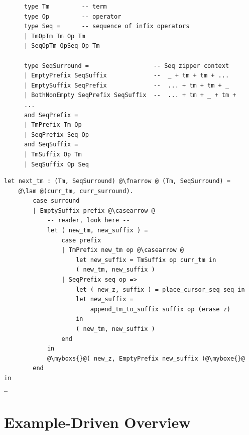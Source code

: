 \documentclass[runningheads]{llncs}
\begin{document}
\begin{figure}
\begin{lstlisting}
type Tm         -- term
type Op         -- operator
type Seq =      -- sequence of infix operators
| TmOpTm Tm Op Tm
| SeqOpTm OpSeq Op Tm
	
type SeqSurround =                  -- Seq zipper context
| EmptyPrefix SeqSuffix             --  _ + tm + tm + ...
| EmptySuffix SeqPrefix             --  ... + tm + tm + _
| BothNonEmpty SeqPrefix SeqSuffix  --  ... + tm + _ + tm + ...
and SeqPrefix =
| TmPrefix Tm Op
| SeqPrefix Seq Op
and SeqSuffix =
| TmSuffix Op Tm
| SeqSuffix Op Seq
\end{lstlisting}
\end{figure}

\begin{minipage}{\linewidth}
\begin{lstlisting}
let next_tm : (Tm, SeqSurround) @\fnarrow @ (Tm, SeqSurround) =
	@\lam @(curr_tm, curr_surround).
		case surround
		| EmptySuffix prefix @\casearrow @
			-- reader, look here --
			let ( new_tm, new_suffix ) =
				case prefix
				| TmPrefix new_tm op @\casearrow @
					let new_suffix = TmSuffix op curr_tm in
					( new_tm, new_suffix )
				| SeqPrefix seq op =>
					let ( new_z, suffix ) = place_cursor_seq seq in
					let new_suffix =
						append_tm_to_suffix suffix op (erase z)
					in
					( new_tm, new_suffix )
				end
			in
			@\myboxs{}@( new_z, EmptyPrefix new_suffix )@\myboxe{}@
		end
in
_
\end{lstlisting}
\end{minipage}

\newpage

\section{Example-Driven Overview} \label{sec:example}
\end{document}

